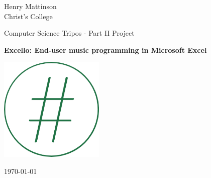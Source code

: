 %
%

\begin{titlepage}
	\noindent
	\begin{minipage}[t][][t]{0.329\textwidth}
    \begin{flushleft}
  \end{flushleft}
	\end{minipage}
  \begin{minipage}[t][][t]{0.329\textwidth}
    \begin{center}
  	\end{center}
	\end{minipage}
	\begin{minipage}{0.329\textwidth}
	\begin{flushright}
    \vspace{-8pt}
		\large Henry Mattinson \\
		Christ's College
	\end{flushright}
	\end{minipage}

	\begin{center}
	\vspace{6cm}
	{\sc\large Computer Science Tripos - Part II Project\par}
	\vspace{0.5cm}
	{\huge\bf Excello: End-user music programming in Microsoft Excel\par}
  \vspace{0.8cm}
  {\includegraphics[width=50mm]{figs/excelloLogoRing.png} \par}
  \vspace{0.5cm}
	{\large \today \par}
	\end{center}

\end{titlepage}
